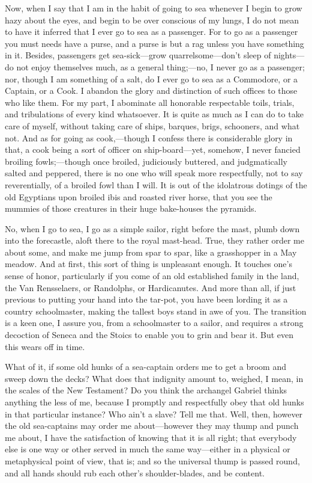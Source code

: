 \documentclass[12pt,ebook,oneside,openany]{memoir} %
\begin{document}
Now, when I say that I am in the habit of going to sea whenever I begin to grow hazy about the eyes, and begin to be over conscious of my lungs, I do not mean to have it inferred that I ever go to sea as a passenger. For to go as a passenger you must needs have a purse, and a purse is but a rag unless you have something in it. Besides, passengers get sea-sick—grow quarrelsome—don’t sleep of nights—do not enjoy themselves much, as a general thing;—no, I never go as a passenger; nor, though I am something of a salt, do I ever go to sea as a Commodore, or a Captain, or a Cook. I abandon the glory and distinction of such offices to those who like them. For my part, I abominate all honorable respectable toils, trials, and tribulations of every kind whatsoever. It is quite as much as I can do to take care of myself, without taking care of ships, barques, brigs, schooners, and what not. And as for going as cook,—though I confess there is considerable glory in that, a cook being a sort of officer on ship-board—yet, somehow, I never fancied broiling fowls;—though once broiled, judiciously buttered, and judgmatically salted and peppered, there is no one who will speak more respectfully, not to say reverentially, of a broiled fowl than I will. It is out of the idolatrous dotings of the old Egyptians upon broiled ibis and roasted river horse, that you see the mummies of those creatures in their huge bake-houses the pyramids.

No, when I go to sea, I go as a simple sailor, right before the mast, plumb down into the forecastle, aloft there to the royal mast-head. True, they rather order me about some, and make me jump from spar to spar, like a grasshopper in a May meadow. And at first, this sort of thing is unpleasant enough. It touches one’s sense of honor, particularly if you come of an old established family in the land, the Van Rensselaers, or Randolphs, or Hardicanutes. And more than all, if just previous to putting your hand into the tar-pot, you have been lording it as a country schoolmaster, making the tallest boys stand in awe of you. The transition is a keen one, I assure you, from a schoolmaster to a sailor, and requires a strong decoction of Seneca and the Stoics to enable you to grin and bear it. But even this wears off in time.

What of it, if some old hunks of a sea-captain orders me to get a broom and sweep down the decks? What does that indignity amount to, weighed, I mean, in the scales of the New Testament? Do you think the archangel Gabriel thinks anything the less of me, because I promptly and respectfully obey that old hunks in that particular instance? Who ain’t a slave? Tell me that. Well, then, however the old sea-captains may order me about—however they may thump and punch me about, I have the satisfaction of knowing that it is all right; that everybody else is one way or other served in much the same way—either in a physical or metaphysical point of view, that is; and so the universal thump is passed round, and all hands should rub each other’s shoulder-blades, and be content.
\end{document}
